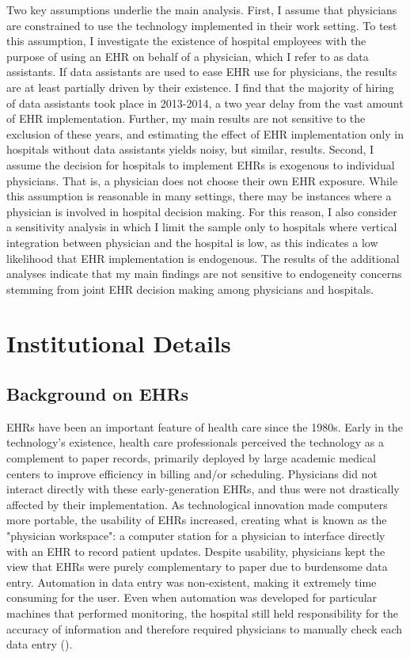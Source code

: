 \documentclass[12pt]{article}
\begin{document}
Two key assumptions underlie the main analysis. First, I assume that physicians are constrained to use the technology implemented in their work setting. To test this assumption, I investigate the existence of hospital employees with the purpose of using an EHR on behalf of a physician, which I refer to as data assistants. If data assistants are used to ease EHR use for physicians, the results are at least partially driven by their existence. I find that the majority of hiring of data assistants took place in 2013-2014, a two year delay from the vast amount of EHR implementation. Further, my main results are not sensitive to the exclusion of these years, and estimating the effect of EHR implementation only in hospitals without data assistants yields noisy, but similar, results. Second, I assume the decision for hospitals to implement EHRs is exogenous to individual physicians. That is, a physician does not choose their own EHR exposure. While this assumption is reasonable in many settings, there may be instances where a physician is involved in hospital decision making. For this reason, I also consider a sensitivity analysis in which I limit the sample only to hospitals where vertical integration between physician and the hospital is low, as this indicates a low likelihood that EHR implementation is endogenous. The results of the additional analyses indicate that my main findings are not sensitive to endogeneity concerns stemming from joint EHR decision making among physicians and hospitals.







\section{Institutional Details}

\subsection{Background on EHRs}
EHRs have been an important feature of health care since the 1980s. Early in the technology's existence, health care professionals perceived the technology as a complement to paper records, primarily deployed by large academic medical centers to improve efficiency in billing and/or scheduling. Physicians did not interact directly with these early-generation EHRs, and thus were not drastically affected by their implementation. As technological innovation made computers more portable, the usability of EHRs increased, creating what is known as the "physician workspace": a computer station for a physician to interface directly with an EHR to record patient updates. Despite usability, physicians kept the view that EHRs were purely complementary to paper due to burdensome data entry. Automation in data entry was non-existent, making it extremely time consuming for the user. Even when automation was developed for particular machines that performed monitoring, the hospital still held responsibility for the accuracy of information and therefore required physicians to manually check each data entry (\cite{evans2016electronic}). 
\end{document}
